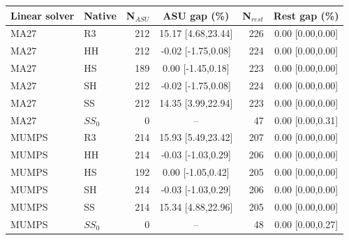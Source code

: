 \begin{tabular}{@{}llrcrc@{}}
\toprule
Linear solver & Native & N$_{ASU}$ & ASU gap (\%) & N$_{rest}$ & Rest gap (\%)\\
\midrule
MA27 & R3 & 212 & 15.17 [4.68,23.44] & 226 & 0.00 [0.00,0.00]\\
MA27 & HH & 212 & -0.02 [-1.75,0.08] & 224 & 0.00 [0.00,0.00]\\
MA27 & HS & 189 & 0.00 [-1.45,0.18] & 223 & 0.00 [0.00,0.00]\\
MA27 & SH & 212 & -0.02 [-1.75,0.08] & 224 & 0.00 [0.00,0.00]\\
MA27 & SS & 212 & 14.35 [3.99,22.94] & 223 & 0.00 [0.00,0.00]\\
MA27 & $SS_0$ & 0 & -- & 47 & 0.00 [0.00,0.31]\\
MUMPS & R3 & 214 & 15.93 [5.49,23.42] & 207 & 0.00 [0.00,0.00]\\
MUMPS & HH & 214 & -0.03 [-1.03,0.29] & 206 & 0.00 [0.00,0.00]\\
MUMPS & HS & 192 & 0.00 [-1.05,0.42] & 205 & 0.00 [0.00,0.00]\\
MUMPS & SH & 214 & -0.03 [-1.03,0.29] & 206 & 0.00 [0.00,0.00]\\
MUMPS & SS & 214 & 15.34 [4.88,22.96] & 205 & 0.00 [0.00,0.00]\\
MUMPS & $SS_0$ & 0 & -- & 48 & 0.00 [0.00,0.27]\\
\bottomrule
\end{tabular}
